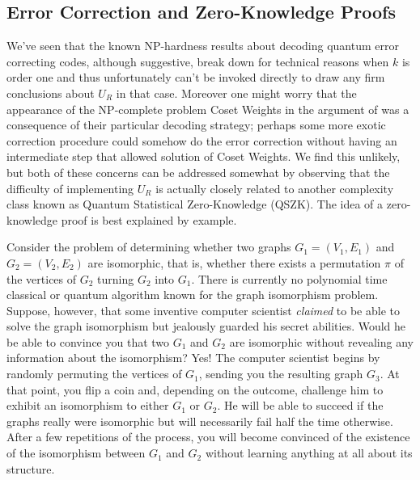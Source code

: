 \documentclass[12pt]{article}
\newcommand{\textcs}[1]{\textsf{#1}}
\newcommand{\NP}{\textcs{NP}}
\begin{document}
\subsection{Error Correction and Zero-Knowledge Proofs}\label{qszksubsect}

We've seen that the known \NP-hardness results about decoding quantum error correcting codes, although suggestive, break down for technical reasons when $k$ is order one and thus unfortunately can't be invoked directly to draw any firm conclusions about $U_R$ in that case.  Moreover one might worry that the appearance of the \NP-complete problem \textcs{Coset Weights} in the argument of \cite{hsieh2011np} was a consequence of their particular decoding strategy; perhaps some more exotic correction procedure could somehow do the error correction without having an intermediate step that allowed solution of \textcs{Coset Weights}.  We find this unlikely, but both of these concerns can be addressed somewhat by observing that the difficulty of implementing $U_R$ is actually closely related to another complexity class known as Quantum Statistical Zero-Knowledge (\textcs{QSZK}). The idea of a zero-knowledge proof is best explained by example. 

Consider the problem of determining whether two graphs $G_1 = (V_1,E_1)$ and $G_2 = (V_2,E_2)$ are isomorphic, that is, whether there exists a permutation $\pi$ of the vertices of $G_2$ turning $G_2$ into $G_1$. There is currently no polynomial time classical or quantum algorithm known for the graph isomorphism problem.
%
Suppose, however, that some inventive computer scientist \emph{claimed} to be able to solve the graph isomorphism but jealously guarded his secret abilities. Would he be able to convince you that two $G_1$ and $G_2$ are isomorphic without revealing any information about the isomorphism? Yes! The computer scientist begins by randomly permuting the vertices of $G_1$, sending you the resulting graph $G_3$. At that point, you flip a coin and, depending on the outcome, challenge him to exhibit an isomorphism to either $G_1$ or $G_2$. He will be able to succeed if the graphs really were isomorphic but will necessarily fail half the time otherwise. After a few repetitions of the process, you will become convinced of the existence of the isomorphism between $G_1$ and $G_2$ without learning anything at all about its structure.
\end{document}
